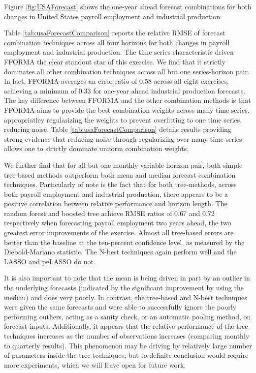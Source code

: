 \documentclass[12pt]{article}
\begin{document}
Figure \ref{fig:USAForecast} shows the one-year ahead forecast combinations for both changes in United States payroll employment and industrial production. 



Table \ref{tab:usaForecastComparison} reports the relative RMSE of forecast combination techniques across all four horizons for both changes in payroll employment and industrial production. The time series characteristic driven FFORMA the clear standout star of this exercise. We find that it strictly dominates all other combination techniques across all but one series-horizon pair. In fact, FFORMA averages an error ratio of 0.58 across all eight exercises, achieving a minimum of 0.33 for one-year ahead industrial production forecasts. The key difference between FFORMA and the other combination methods is that FFORMA aims to provide the best combination weights across many time series, appropriatley regularizing the weights to prevent overfitting to one time series, reducing noise. Table \ref{tab:usaForecastComparison} details results providing strong evidence that reducing noise through regularizing over many time series allows one to strictly dominate uniform combination weights. 

We further find that for all but one monthly variable-horizon pair, both simple tree-based methods outperform both mean and median forecast combination techniques. Particularly of note is the fact that for both tree-methods, across both payroll employment and industrial production, there appears to be a positive correlation between relative performance and horizon length. The random forest and boosted tree achieve RMSE ratios of 0.67 and 0.72 respectively when forecasting payroll employment two years ahead, the two greatest error improvements of the exercise. Almost all tree-based errors are better than the baseline at the ten-percent confidence level, as measured by the Diebold-Mariano statistic. The N-best techniques again perform well and the LASSO and peLASSO do not.

It is also important to note that the mean is being driven in part by an outlier in the underlying forecasts (indicated by the significant improvement by using the median) and does very poorly. In contrast, the tree-based and N-best techniques were given the same forecasts and were able to successfully ignore the poorly performing outliers, acting as a sanity check, or an automatic pooling method, on forecast inputs. Additionally, it appears that the relative performance of the tree-techniques increases as the number of observations increases (comparing monthly to quarterly results). This phenomenon may be driving by relatively large number of parameters inside the tree-techniques, but to definite conclusion would require more experiments, which we will leave open for future work. 
\end{document}
